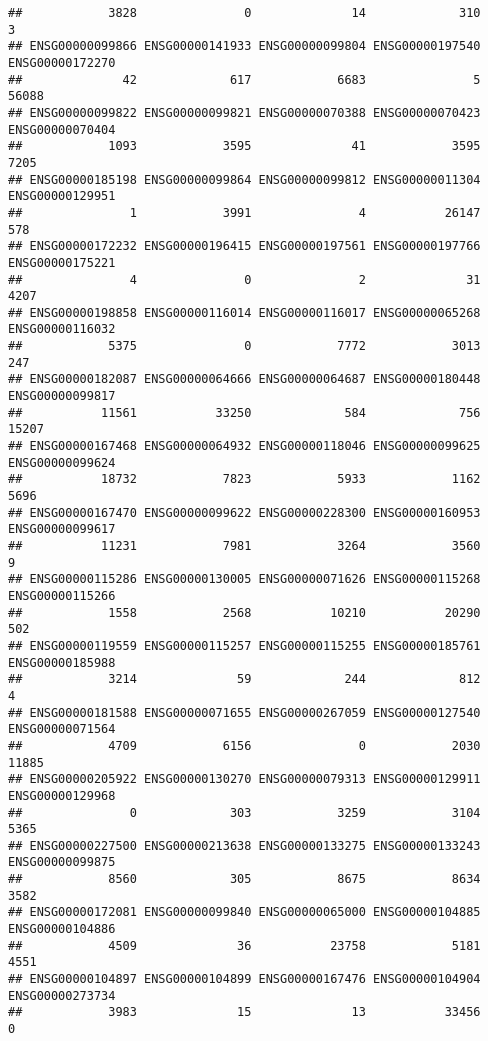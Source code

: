 \documentclass[
]{article}
\begin{document}
\begin{verbatim}
##            3828               0              14             310               3 
## ENSG00000099866 ENSG00000141933 ENSG00000099804 ENSG00000197540 ENSG00000172270 
##              42             617            6683               5           56088 
## ENSG00000099822 ENSG00000099821 ENSG00000070388 ENSG00000070423 ENSG00000070404 
##            1093            3595              41            3595            7205 
## ENSG00000185198 ENSG00000099864 ENSG00000099812 ENSG00000011304 ENSG00000129951 
##               1            3991               4           26147             578 
## ENSG00000172232 ENSG00000196415 ENSG00000197561 ENSG00000197766 ENSG00000175221 
##               4               0               2              31            4207 
## ENSG00000198858 ENSG00000116014 ENSG00000116017 ENSG00000065268 ENSG00000116032 
##            5375               0            7772            3013             247 
## ENSG00000182087 ENSG00000064666 ENSG00000064687 ENSG00000180448 ENSG00000099817 
##           11561           33250             584             756           15207 
## ENSG00000167468 ENSG00000064932 ENSG00000118046 ENSG00000099625 ENSG00000099624 
##           18732            7823            5933            1162            5696 
## ENSG00000167470 ENSG00000099622 ENSG00000228300 ENSG00000160953 ENSG00000099617 
##           11231            7981            3264            3560               9 
## ENSG00000115286 ENSG00000130005 ENSG00000071626 ENSG00000115268 ENSG00000115266 
##            1558            2568           10210           20290             502 
## ENSG00000119559 ENSG00000115257 ENSG00000115255 ENSG00000185761 ENSG00000185988 
##            3214              59             244             812               4 
## ENSG00000181588 ENSG00000071655 ENSG00000267059 ENSG00000127540 ENSG00000071564 
##            4709            6156               0            2030           11885 
## ENSG00000205922 ENSG00000130270 ENSG00000079313 ENSG00000129911 ENSG00000129968 
##               0             303            3259            3104            5365 
## ENSG00000227500 ENSG00000213638 ENSG00000133275 ENSG00000133243 ENSG00000099875 
##            8560             305            8675            8634            3582 
## ENSG00000172081 ENSG00000099840 ENSG00000065000 ENSG00000104885 ENSG00000104886 
##            4509              36           23758            5181            4551 
## ENSG00000104897 ENSG00000104899 ENSG00000167476 ENSG00000104904 ENSG00000273734 
##            3983              15              13           33456               0 

\end{verbatim}
\end{document}
